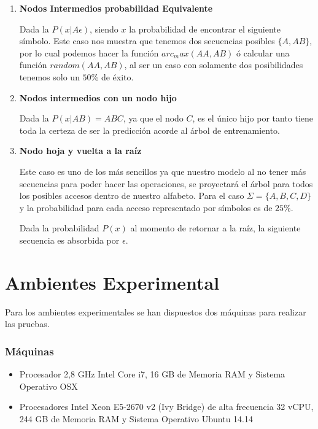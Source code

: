 \begin{enumerate}
	\item \textbf{Nodos Intermedios probabilidad Equivalente}
	
	Dada la $P( x | A\epsilon  )$, siendo $x$ la probabilidad de encontrar el siguiente símbolo. Este caso nos muestra que tenemos dos secuencias posibles $\{A,AB\}$, por lo cual podemos hacer la función $arc_max(AA,AB)$ ó calcular una función $random(AA,AB)$, al ser un caso con solamente dos posibilidades tenemos solo un $50\%$ de éxito.
	
	
	\item \textbf{Nodos intermedios con un nodo hijo }
	
	Dada la $P( x | AB  )  = ABC$, ya que  el nodo $C$, es el único hijo por tanto tiene toda la certeza de ser la predicción acorde al árbol de entrenamiento.
		
		
		
	\item \textbf{Nodo hoja y vuelta a la raíz}	
	
	Este caso es uno de los más sencillos ya que nuestro modelo al no tener más secuencias para poder hacer las operaciones, se proyectará el árbol para todos los posibles accesos dentro de nuestro alfabeto. Para el caso $\Sigma = \{A,B,C,D \} $ y la probabilidad para cada acceso representado por símbolos es de $25\%$.
	
	
	Dada la probabilidad $P( x ) $ al momento de retornar a la raíz, la siguiente secuencia es absorbida por $\epsilon$.
	

\end{enumerate}



\section{Ambientes Experimental}

Para los ambientes experimentales se han dispuestos dos máquinas para realizar las pruebas. 

\subsubsection{Máquinas}
	\begin{itemize}
		\item Procesador 2,8 GHz Intel Core i7, 16 GB de Memoria RAM y Sistema Operativo OSX
		\item Procesadores Intel Xeon E5-2670 v2 (Ivy Bridge) de alta frecuencia 32 vCPU, 244 GB de Memoria RAM y Sistema Operativo Ubuntu 14.14 
	\end{itemize}
	

